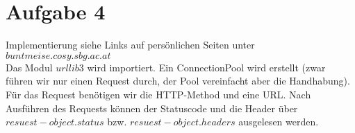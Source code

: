 \documentclass[12pt, a4paper]{report}
\begin{document}
\section*{Aufgabe 4}
Implementierung siehe Links auf persönlichen Seiten unter $buntmeise.cosy.sbg.ac.at$\\
Das Modul $urllib3$ wird importiert. Ein ConnectionPool wird erstellt (zwar führen wir nur einen Request durch, der Pool vereinfacht aber die Handhabung). Für das Request benötigen wir die HTTP-Method und eine URL. Nach Ausführen des Requests können der Statuscode und die Header über $resuest-object.status$ bzw. $resuest-object.headers$ ausgelesen werden.
\end{document}
